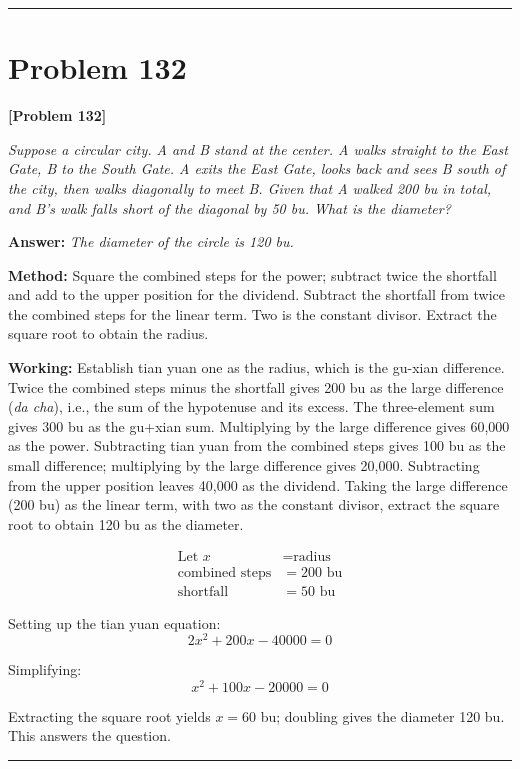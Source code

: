 \documentclass[11pt,a4paper]{book}
\newcommand{\answer}[1]{\noindent\textbf{\color{anacolor}Answer: }\textit{#1}\par}
\newcommand{\method}[1]{\noindent\textbf{\color{methodcolor}Method: }#1\par}
\newcommand{\working}[1]{\noindent\textbf{\color{workcolor}Working: }#1\par}
\newcommand{\shortline}{\noindent\rule{0.5\textwidth}{0.4pt}\par}
\begin{document}
\shortline

\section{Problem 132}
\label{sec:prob132}

\noindent\textbf{\color{probcolor}[Problem 132]}

\textit{Suppose a circular city. A and B stand at the center. A walks straight to the East Gate, B to the South Gate. A exits the East Gate, looks back and sees B south of the city, then walks diagonally to meet B. Given that A walked 200 bu in total, and B's walk falls short of the diagonal by 50 bu. What is the diameter?}

\answer{The diameter of the circle is 120 bu.}

\method{Square the combined steps for the power; subtract twice the shortfall and add to the upper position for the dividend. Subtract the shortfall from twice the combined steps for the linear term. Two is the constant divisor. Extract the square root to obtain the radius.}

\working{Establish tian yuan one as the radius, which is the gu-xian difference. Twice the combined steps minus the shortfall gives 200 bu as the large difference (\textit{da cha}), i.e., the sum of the hypotenuse and its excess. The three-element sum gives 300 bu as the gu+xian sum. Multiplying by the large difference gives 60,000 as the power. Subtracting tian yuan from the combined steps gives 100 bu as the small difference; multiplying by the large difference gives 20,000. Subtracting from the upper position leaves 40,000 as the dividend. Taking the large difference (200 bu) as the linear term, with two as the constant divisor, extract the square root to obtain 120 bu as the diameter.

\begin{align*}
\text{Let } x &= \text{radius} \\
\text{combined steps} &= 200 \text{ bu} \\
\text{shortfall} &= 50 \text{ bu}
\end{align*}

Setting up the tian yuan equation:
$$2x^2 + 200x - 40000 = 0$$

Simplifying:
$$x^2 + 100x - 20000 = 0$$

Extracting the square root yields $x = 60$ bu; doubling gives the diameter 120 bu. This answers the question.}

\shortline
\end{document}
